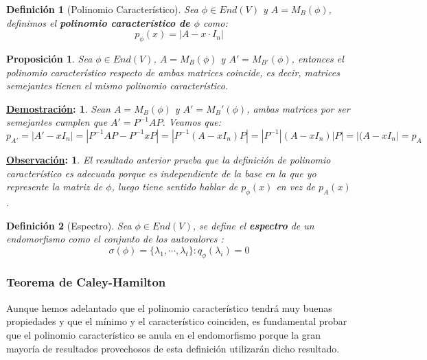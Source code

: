 \documentclass[10pt,a4paper,openright]{book}
\theoremstyle{break}
\newtheorem*{defi}{Definición}
\newtheorem*{prop}{Proposición}
\newtheorem*{demo}{\underline{Demostración}:}
\newtheorem*{obs}{\underline{Observación}:}
\begin{document}
\begin{defi}[Polinomio Característico]
Sea $\phi\in End(V)$ y $A = M_B(\phi)$, definimos el \textbf{polinomio característico de $\phi$} como:
$$p_\phi(x) = |A- x\cdot I_n|$$
\end{defi}

\begin{prop}
Sea $\phi\in End(V)$, $A=M_B(\phi)$ y $A'=M_{B'}(\phi)$, entonces el polinomio característico respecto de ambas matrices coincide, es decir, matrices semejantes tienen el mismo polinomio característico.
\end{prop}
\begin{demo}
Sean $A=M_B(\phi)$ y $A'=M_B'(\phi)$, ambas matrices por ser semejantes cumplen que $A'=P^{-1}AP$. Veamos que:
$$p_{A'}=|A'-xI_n|=|P^{-1}AP-P^{-1}xP|=|P^{-1}(A-xI_n)P|=|P^{-1}|(A-xI_n)|P|=|(A-xI_n|=p_A$$
\end{demo}

\begin{obs}
El resultado anterior prueba que la definición de polinomio característico es adecuada porque es independiente de la base en la que yo represente la matriz de $\phi$, luego tiene sentido hablar de $p_\phi(x)$ en vez de $p_A(x)$.
\end{obs}

\begin{defi}[Espectro]
Sea $\phi \in End(V)$, se define el \textbf{espectro} de un endomorfismo como el conjunto de los autovalores :
$$\sigma(\phi)=\{\lambda_1, \cdots, \lambda_t\}: q_\phi(\lambda_i) = 0$$
\end{defi}

\subsubsection{Teorema de Caley-Hamilton}
Aunque hemos adelantado que el polinomio característico tendrá muy buenas propiedades y que el mínimo y el característico coinciden, es fundamental probar que el polinomio característico se anula en el endomorfismo porque la gran mayoría de resultados provechosos de esta definición utilizarán dicho resultado.
\end{document}
